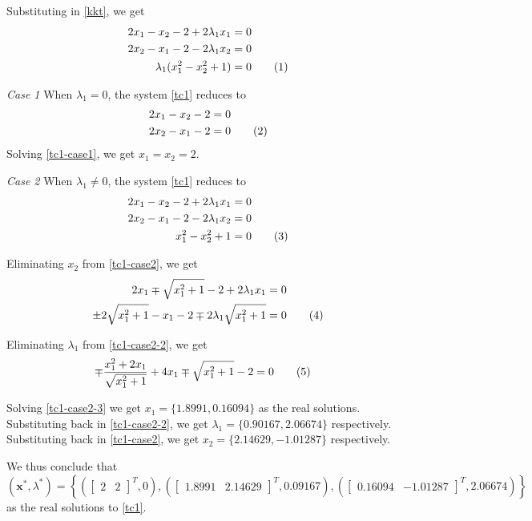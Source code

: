 \documentclass[a4paper]{article}
\newcommand{\numberthis}{\addtocounter{equation}{1}\tag{\theequation}}
\newcommand{\labeleqn}[1]{\numberthis \label{#1}}
\newcommand{\case}[1]{\numberthis \vspace*{10px} \textit{Case #1} \hspace*{2.5px}}
\begin{document}
Substituting in \eqref{kkt}, we get
\begin{align*}
2 x_1 - x_2 - 2 + 2 \lambda_1 x_1 &= 0 \\
2 x_2 - x_1 - 2 - 2 \lambda_1 x_2 &= 0 \\
\lambda_1 (x_1^2 - x_2^2 + 1) &= 0 \labeleqn{tc1}
\end{align*}

\case{1} When $\lambda_1 = 0$, the system \eqref{tc1} reduces to
\begin{align*}
2 x_1 - x_2 - 2 &= 0 \\
2 x_2 - x_1 - 2 &= 0 \labeleqn{tc1-case1}
\end{align*}
Solving \eqref{tc1-case1}, we get $x_1 = x_2 = 2$.

\case{2} When $\lambda_1 \neq 0$, the system \eqref{tc1} reduces to
\begin{align*}
2 x_1 - x_2 - 2 + 2 \lambda_1 x_1 &= 0 \\
2 x_2 - x_1 - 2 - 2 \lambda_1 x_2 &= 0 \\
x_1^2 - x_2^2 + 1 &= 0 \labeleqn{tc1-case2}
\end{align*}

Eliminating $x_2$ from \eqref{tc1-case2}, we get
\begin{align*}
2 x_1 \mp \sqrt{x_1^2 + 1} - 2 + 2 \lambda_1 x_1 &= 0 \\
\pm 2 \sqrt{x_1^2 + 1} - x_1 - 2 \mp 2 \lambda_1 \sqrt{x_1^2 + 1} &= 0 \labeleqn{tc1-case2-2}
\end{align*}

Eliminating $\lambda_1$ from \eqref{tc1-case2-2}, we get
\begin{align*}
\mp \frac{x_1^2 + 2x_1}{\sqrt{x_1^2 + 1}} + 4x_1 \mp \sqrt{x_1^2 + 1} - 2 &= 0 \labeleqn{tc1-case2-3}
\end{align*}

Solving \eqref{tc1-case2-3} we get $x_1 = \{1.8991, 0.16094\}$ as the real solutions. Substituting back in \eqref{tc1-case2-2}, we get $\lambda_1 = \{0.90167, 2.06674\}$ respectively. Substituting back in \eqref{tc1-case2}, we get $x_2 = \{2.14629, -1.01287\}$ respectively.

We thus conclude that $(\textbf{x}^*, \lambda^*) = \left\{ \left( \begin{bmatrix} 2 & 2 \end{bmatrix} ^T, 0 \right), \left( \begin{bmatrix} 1.8991 & 2.14629 \end{bmatrix} ^T, 0.09167 \right), \left( \begin{bmatrix} 0.16094 & -1.01287 \end{bmatrix} ^T, 2.06674 \right) \right\}$ as the real solutions to \eqref{tc1}.
\end{document}
